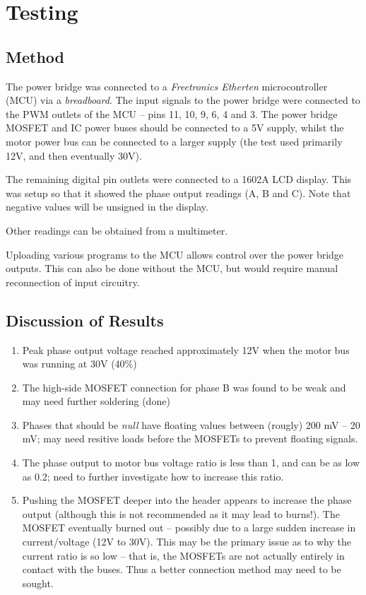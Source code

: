 \documentclass[a4paper]{article}
\begin{document}
\section{Testing}
  \subsection{Method}
  The power bridge was connected to a \textit{Freetronics Etherten}
  microcontroller (MCU) via a \textit{breadboard}. The input signals to the power
  bridge were connected to the PWM outlets of the MCU -- pins 11, 10, 9, 6, 4
  and 3. The power bridge MOSFET and IC power buses  should be connected to a 5V
  supply, whilst the motor power bus can be connected to a larger supply (the
  test used primarily 12V, and then eventually 30V).

  The remaining digital pin outlets were connected to a 1602A LCD
  display. This was setup so that it showed the phase output readings (A, B and
  C). Note that negative values will be unsigned in the display.

  Other readings can be obtained from a multimeter.

  Uploading various programs to the MCU allows control over the power bridge
  outputs. This can also be done without the MCU, but would require manual
  reconnection of input circuitry.

  \subsection{Discussion of Results}
  \begin{enumerate}
    \item Peak phase output voltage reached approximately 12V when the motor bus
    was running at 30V (40\%)
    \item The high-side MOSFET connection for phase B was found to be weak and
    may need further soldering (done)
    \item Phases that should be \textit{null} have floating values between
    (rougly) 200 mV -- 20 mV; may need resitive loads before the MOSFETs to
    prevent floating signals.
    \item The phase output to motor bus voltage ratio is less than 1, and can be
    as low as 0.2; need to further investigate how to increase this ratio.
    \item Pushing the MOSFET deeper into the header appears to increase the
    phase output (although this is not recommended as it may lead to burns!).
    The MOSFET eventually burned out -- possibly due to a large sudden increase in
    current/voltage (12V to 30V). This may be the primary issue as to why the
    current ratio is so low -- that is, the MOSFETs are not actually entirely in
    contact with the buses. Thus a better connection method may need to be sought.
  \end{enumerate}
\end{document}
